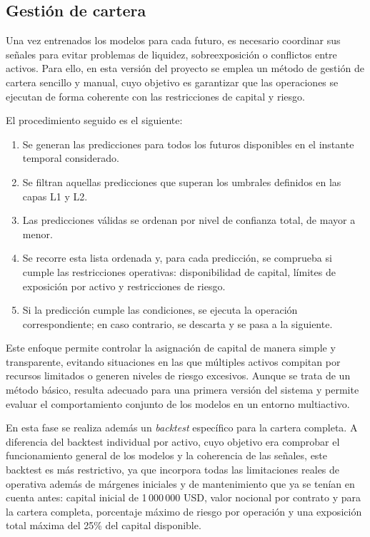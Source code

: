 \subsection{Gestión de cartera}

Una vez entrenados los modelos para cada futuro, es necesario coordinar sus señales para evitar problemas de liquidez, sobreexposición o conflictos
entre activos. Para ello, en esta versión del proyecto se emplea un método de gestión de cartera sencillo y manual, cuyo objetivo es garantizar que
las operaciones se ejecutan de forma coherente con las restricciones de capital y riesgo.

El procedimiento seguido es el siguiente:

\begin{enumerate}
    \item Se generan las predicciones para todos los futuros disponibles en el instante temporal considerado.
    \item Se filtran aquellas predicciones que superan los umbrales definidos en las capas L1 y L2.
    \item Las predicciones válidas se ordenan por nivel de confianza total, de mayor a menor.
    \item Se recorre esta lista ordenada y, para cada predicción, se comprueba si cumple las restricciones operativas: disponibilidad de capital,
    límites de exposición por activo y restricciones de riesgo.
    \item Si la predicción cumple las condiciones, se ejecuta la operación correspondiente; en caso contrario, se descarta y se pasa a la siguiente.
\end{enumerate}

Este enfoque permite controlar la asignación de capital de manera simple y transparente, evitando situaciones en las que múltiples activos compitan
por recursos limitados o generen niveles de riesgo excesivos. Aunque se trata de un método básico, resulta adecuado para una primera versión del
sistema y permite evaluar el comportamiento conjunto de los modelos en un entorno multiactivo.

En esta fase se realiza además un \textit{backtest} específico para la cartera completa. A diferencia del backtest individual por activo, cuyo
objetivo era comprobar el funcionamiento general de los modelos y la coherencia de las señales, este backtest es más restrictivo, ya que incorpora
todas las limitaciones reales de operativa además de márgenes iniciales y de mantenimiento que ya se tenían en cuenta antes: capital inicial de
1\,000\,000 USD, valor nocional por contrato y para la cartera completa, porcentaje máximo de riesgo por operación y una exposición total máxima del
25\% del capital disponible.


